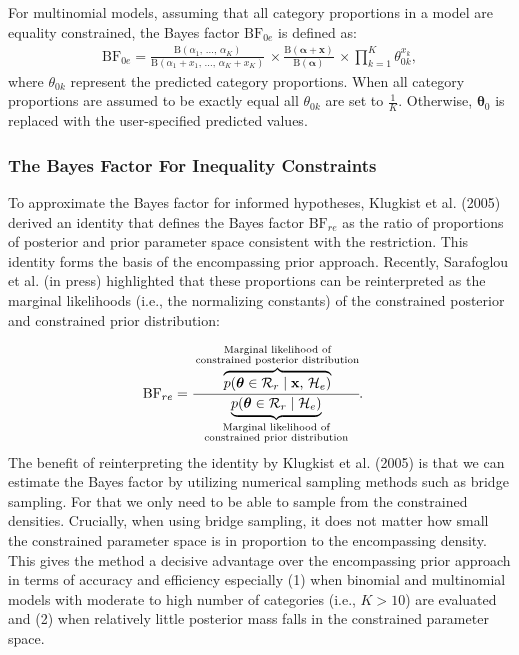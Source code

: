 \documentclass[
  english,
  man,floatsintext]{apa6}
\begin{document}
For multinomial models, assuming that all category proportions in a model are equality constrained, the Bayes factor \(\text{BF}_{0e}\) is defined as:
\begin{align*}
\text{BF}_{0e} =  \frac{
 \text{B}\left(\alpha_{1}\text{, }\dots\text{, }\alpha_K\right)}{\text{B}\left(\alpha_1+x_1\text{, }\dots\text{, }\alpha_K+x_K\right)} \, \times 
\frac{\text{B}(\boldsymbol{\alpha}+\mathbf{x})}{\text{B}(\boldsymbol{\alpha})} \, \times  \prod_{k=1}^K \theta_{0k}^{x_k},
\end{align*}
where \(\theta_{0k}\) represent the predicted category proportions. When all category proportions are assumed to be exactly equal all \(\theta_{0k}\) are set to \(\frac{1}{K}\). Otherwise, \(\boldsymbol{\theta}_{0}\) is replaced with the user-specified predicted values.

\hypertarget{the-bayes-factor-for-inequality-constraints}{%
\subsubsection{The Bayes Factor For Inequality Constraints}\label{the-bayes-factor-for-inequality-constraints}}

\noindent To approximate the Bayes factor for informed hypotheses, Klugkist et al. (2005) derived an identity that defines the Bayes factor \(\text{BF}_{re}\) as the ratio of proportions of posterior and prior parameter space consistent with the restriction. This identity forms the basis of the encompassing prior approach. Recently, Sarafoglou et al. (in press) highlighted that these proportions can be reinterpreted as the marginal likelihoods (i.e., the normalizing constants) of the constrained posterior and constrained prior distribution:

\begin{align}
\label{Eq:klugkistIdentity}
\text{BF}_{re} &= \cfrac{\overbrace{p(\boldsymbol{\theta} \in \mathcal{R}_r \mid \mathbf{x}\text{, }\mathcal{H}_e)}^{\substack{\text{Marginal likelihood of}\\\text{constrained posterior distribution}}}}{\underbrace{p(\boldsymbol{\theta} \in \mathcal{R}_r \mid  \mathcal{H}_e)}_{\substack{\text{Marginal likelihood of}\\\text{constrained prior distribution}}}}.
\end{align}
The benefit of reinterpreting the identity by Klugkist et al. (2005) is that we can estimate the Bayes factor by utilizing numerical sampling methods such as bridge sampling. For that we only need to be able to sample from the constrained densities. Crucially, when using bridge sampling, it does not matter how small the constrained parameter space is in proportion to the encompassing density. This gives the method a decisive advantage over the encompassing prior approach in terms of accuracy and efficiency especially (1) when binomial and multinomial models with moderate to high number of categories (i.e., \(K > 10\)) are evaluated and (2) when relatively little posterior mass falls in the constrained parameter space.
\end{document}
